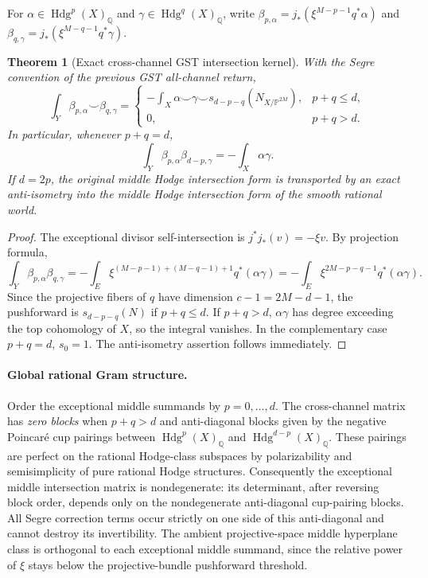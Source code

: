 \documentclass[11pt]{article}
\newcommand{\Q}{\mathbb Q}
\newcommand{\Hdg}{\operatorname{Hdg}}
\newtheorem{theorem}{Theorem}[section]
\begin{document}
For \(\alpha\in\Hdg^p(X)_{\Q}\) and
\(\gamma\in\Hdg^q(X)_{\Q}\), write
\(\beta_{p,\alpha}=j_*(\xi^{M-p-1}q^*\alpha)\)
and \(\beta_{q,\gamma}=j_*(\xi^{M-q-1}q^*\gamma)\).
\begin{theorem}[Exact cross-channel GST intersection kernel]
With the Segre convention of the previous GST
all-channel return,
\[
 \boxed{
 \int_Y\beta_{p,\alpha}\smile\beta_{q,\gamma}
 =\begin{cases}
 -\int_X\alpha\smile\gamma\smile
       s_{d-p-q}(N_{X/\mathbb P^{2M}}),
       &p+q\le d,\\
 0,&p+q>d.
 \end{cases}}
 \tag{3.1}
\]
In particular, whenever \(p+q=d\),
\[
 \boxed{
 \int_Y\beta_{p,\alpha}\beta_{d-p,\gamma}
 =-\int_X\alpha\gamma.}
 \tag{3.2}
\]
If \(d=2p\), the original middle Hodge
intersection form is transported by an exact
\emph{anti-isometry} into the middle Hodge
intersection form of the smooth rational world.
\end{theorem}
\begin{proof}
The exceptional divisor self-intersection is
\(j^*j_*(v)=-\xi v\). By projection formula,
\[
 \int_Y\beta_{p,\alpha}\beta_{q,\gamma}
  =-\int_E
  \xi^{(M-p-1)+(M-q-1)+1}q^*(\alpha\gamma)
  =-\int_E\xi^{2M-p-q-1}q^*(\alpha\gamma).
\]
Since the projective fibers of \(q\) have
dimension \(c-1=2M-d-1\),
the pushforward is \(s_{d-p-q}(N)\)
if \(p+q\le d\). If \(p+q>d\),
\(\alpha\gamma\) has degree exceeding
the top cohomology of \(X\), so the
integral vanishes. In the complementary
case \(p+q=d\), \(s_0=1\). The
anti-isometry assertion follows immediately.
\end{proof}

\paragraph{Global rational Gram structure.}
Order the exceptional middle summands by
\(p=0,\ldots,d\). The cross-channel matrix
has \emph{zero blocks} when \(p+q>d\)
and anti-diagonal blocks given by
the negative Poincaré cup pairings between
\(\Hdg^p(X)_{\Q}\) and
\(\Hdg^{d-p}(X)_{\Q}\).
These pairings are perfect on the
rational Hodge-class subspaces by
polarizability and semisimplicity of
pure rational Hodge structures.
Consequently the exceptional middle
intersection matrix is nondegenerate:
its determinant, after reversing block order,
depends only on the nondegenerate
anti-diagonal cup-pairing blocks.
All Segre correction terms occur
strictly on one side of this anti-diagonal
and cannot destroy its invertibility.
The ambient projective-space middle
hyperplane class is orthogonal to each
exceptional middle summand, since the
relative power of \(\xi\) stays below
the projective-bundle pushforward threshold.
\end{document}
